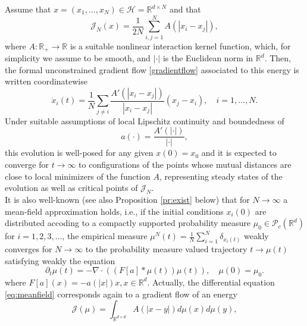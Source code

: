 Assume that $x=(x_1,\dots,x_N) \in \mathcal H= \mathbb R^{d\times N}$ and that 
$$
\mathcal J_N(x) = \frac{1}{2N} \sum_{i,j=1}^N A(| x_i -  x_j |),
$$
where $A:\mathbb R_+ \to \mathbb R$ is a suitable nonlinear interaction kernel function, which, for simplicity we assume to be smooth, and $|\cdot|$ is the Euclidean norm in $\mathbb R^d$. Then, the formal unconstrained gradient flow \eqref{gradientflow} associated to this energy is written coordinatewise
\begin{equation}\label{fdgradientflow}
\dot x_i(t) = \frac{1}{N} \sum_{j \neq i} \frac{A'(| x_i -  x_j |)}{| x_i -  x_j |} (x_j - x_i), \quad i=1,\dots,N.
\end{equation}
Under suitable assumptions of local Lipschitz continuity and boundedness of 
\begin{equation}\label{intker}
a(\cdot) = \frac{A'(|\cdot|)}{| \cdot |},
\end{equation} this evolution is well-posed for any given $x(0)=x_0$ and it is expected to converge for $t \to \infty$ to configurations of the points whose mutual distances are close to local minimizers of the function $A$, representing steady states of the evolution as well as critical points of $\mathcal J_N$.\\
It is also well-known \cite{AGS} (see also Proposition \ref{pr:exist} below) that for $N \to \infty$ a mean-field approximation holds, i.e., if the initial conditions $x_i(0)$ are distributed accoding to a compactly supported probability measure $\mu_0 \in \mathcal P_c(\mathbb R^d)$ for $i=1,2,3, \dots$, the empirical measure $\mu^N(t) = \frac{1}{N} \sum_{i=1}^N \delta_{x_i(t)}$ weakly converges for $N \to \infty$  to the probability measure valued trajectory $t \to \mu(t)$ satisfying weakly the equation
\begin{equation}\label{eq:meanfield}
\partial_t \mu(t) = - \nabla \cdot ((F[a] * \mu(t)) \mu(t)), \quad \mu(0)=\mu_0.
\end{equation}
where $F[a](x) =-a(| x |)x, x \in \mathbb R^{d}$. Actually, the differential equation \eqref{eq:meanfield} corresponds again to a gradient flow of an energy
$$
\mathcal J (\mu) = \int_{\mathbb R^{d\times d}} A(| x-  y |) d \mu(x) d\mu(y),
$$
